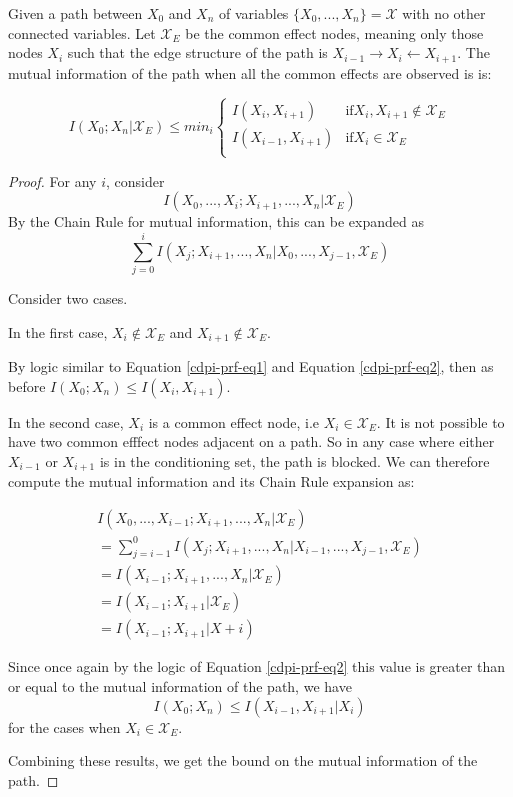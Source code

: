 \documentclass[../thesis.tex]{subfiles}
\begin{document}
\begin{thm}
  \label{thm:path-mutual-information}
  Given a path between $X_0$ and $X_n$
  of variables $\{X_0, ..., X_n\} = \mathcal{X}$ with no other connected
  variables.
  Let $\mathcal{X}_E$ be the common effect nodes, meaning only those
  nodes $X_i$ such that the edge structure of the path is
  $X_{i-1} \rightarrow X_i \leftarrow X_{i+1}$.
  The mutual information of the path when all the common effects
  are observed is is:
  
  $$I(X_0; X_n \vert \mathcal{X}_E) \leq min_{i} 
  \begin{cases}
    I(X_i,X_{i+1}) & \text{if} X_i,X_{i+1} \notin \mathcal{X}_E \\
    I(X_{i-1},X_{i+1}) & \text{if} X_i \in \mathcal{X}_E\\
  \end{cases}$$
  
\end{thm}
\begin{proof}
  For any $i$, consider
  $$I(X_0,..., X_i;X_{i+1},..., X_n \vert \mathcal{X}_E)$$
  By the Chain Rule for mutual information, this can be expanded as
  $$\sum_{j=0}^i I(X_j;X_{i+1},..., X_n \vert X_0,..., X_{j-1},\mathcal{X}_E)$$

  Consider two cases.

  In the first case, $X_i \notin \mathcal{X}_E$
  and $X_{i+1} \notin \mathcal{X}_E$.

  By logic similar to Equation \ref{cdpi-prf-eq1}
  and Equation \ref{cdpi-prf-eq2}, then as before
  $I(X_0;X_n) \leq I(X_i,X_{i+1})$.
  
  In the second case, $X_i$ is a common effect node,
  i.e $X_i \in \mathcal{X}_E$.
  It is not possible to have two common
  efffect nodes adjacent on a path.
  So in any case where either $X_{i-1}$ or $X_{i+1}$ is
  in the conditioning set, the path is blocked.
  We can therefore compute the mutual information and its Chain Rule
  expansion as:
  
  \begin{equation}
    \begin{split}
      I(X_0,..., X_{i-1};X_{i+1},..., X_n \vert \mathcal{X}_E) \\
      = \sum_{j=i-1}^0 I(X_j;X_{i+1},..., X_n \vert X_{i-1},..., X_{j-1},\mathcal{X}_E) \\
      = I(X_{i-1};X_{i+1},..., X_n \vert \mathcal{X}_E)\\
      = I(X_{i-1};X_{i+1} \vert \mathcal{X}_E)\\
      = I(X_{i-1};X_{i+1} \vert X+i)
    \end{split}
  \end{equation}

  Since once again by the logic of Equation \ref{cdpi-prf-eq2}
  this value is greater than or equal to the mutual information of
  the path, we have
  $$I(X_0;X_n) \leq I(X_{i-1},X_{i+1} \vert X_i)$$
  for the cases when $X_i \in \mathcal{X}_E$.

  Combining these results, we get the bound on the mutual
  information of the path.  
\end{proof}
\end{document}
